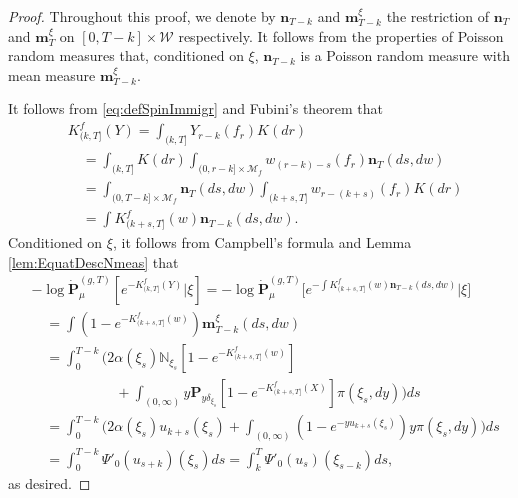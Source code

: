 \begin{proof}
	Throughout this proof,
we denote by $\mathbf n_{T-k}$ and $\mathbf m^\xi_{T-k}$
	the restriction of $\mathbf n_T$ and $\mathbf m^\xi_T$ on $[0,T-k] \times \mathcal W$ respectively.
	It follows from the properties of Poisson random measures that, conditioned on $\xi$, $\mathbf n_{T-k}$ is a Poisson random measure with mean measure $\mathbf m^\xi_{T-k}$.
\par
	It follows from \eqref{eq:defSpinImmigr} and Fubini's theorem that
\begin{equation}\label{eq:kfy_is_nkf}\begin{split}
    &K_{(k,T]}^f(Y)
    = \int_{(k,T]} Y_{r-k}(f_r) K(dr) \\
	&\quad = \int_{(k,T]} K(dr) \int_{(0,r-k] \times \mathcal M_f} w_{(r-k)-s}(f_r) \mathbf n_T(ds,dw)\\
	&\quad = \int_{(0,T-k] \times \mathcal M_f} \mathbf n_T(ds,dw) \int_{(k+s,T]} w_{r-(k+s)}(f_r) K(dr)\\
    &\quad = \int K^f_{(k + s, T]}(w)\mathbf n_{T-k}(ds,dw).
\end{split}\end{equation}
	Conditioned on $\xi$, it follows from Campbell's formula and Lemma \ref{lem:EquatDescNmeas} that
\[\begin{split}
    &-\log \dot{\mathbf P}^{(g,T)}_\mu[e^{-K^f_{(k, T]}(Y)}|\xi]
    = -\log \dot{\mathbf P}^{(g,T)}_\mu\big[e^{-\int K^f_{(k + s, T]}(w)\mathbf n_{T-k}(ds,dw)}\big|\xi\big]\\
	&\quad = \int(1 - e^{-K_{(k + s, T]}^f (w)})\mathbf m^\xi_{T-k}(ds,dw)\\
	&\quad = \int_0^{T-k} \Big(2\alpha(\xi_s) \mathbb N_{\xi_s}[1 - e^{-K_{(k + s, T]}^f(w)}] \\
	&\qquad\qquad\qquad + \int_{(0,\infty)} y \mathbf P_{y \delta_{\xi_s}}[1 - e^{-K_{(k + s, T]}^f(X)}] \pi(\xi_s,dy)\Big) ds\\
	&\quad = \int_0^{T-k} \Big(2\alpha(\xi_s) u_{k+s}(\xi_s) + \int_{(0,\infty)} (1 - e^{-yu_{k+s}(\xi_s)})y\pi(\xi_s,dy)\Big) ds\\
	&\quad =\int_0^{T-k} \Psi'_0(u_{s+k})(\xi_s) ds
	=\int_k^T \Psi'_0(u_s)(\xi_{s-k}) ds,
\end{split}\]
	as desired.
\end{proof}
